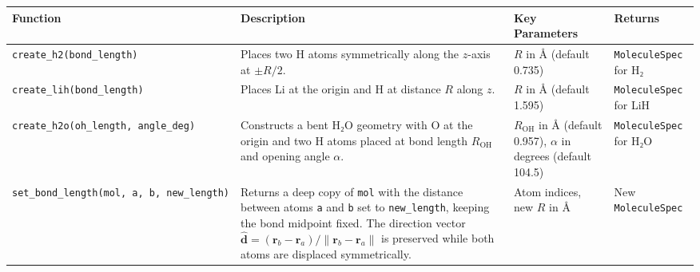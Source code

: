 \documentclass[
  11pt,
]{report}
\newcounter{none} %
\begin{document}
{\def\LTcaptype{none} %
\begin{longtable}[]{@{}
  >{\raggedright\arraybackslash}p{}
  >{\raggedright\arraybackslash}p{}
  >{\raggedright\arraybackslash}p{}
  >{\raggedright\arraybackslash}p{}@{}}
\toprule\noalign{}
\begin{minipage}[b]{\linewidth}\raggedright
Function
\end{minipage} & \begin{minipage}[b]{\linewidth}\raggedright
Description
\end{minipage} & \begin{minipage}[b]{\linewidth}\raggedright
Key Parameters
\end{minipage} & \begin{minipage}[b]{\linewidth}\raggedright
Returns
\end{minipage} \\
\midrule\noalign{}
\endhead
\bottomrule\noalign{}
\endlastfoot
\texttt{create\_h2(bond\_length)} & Places two H atoms symmetrically
along the \(z\)-axis at \(\pm R/2\). & \(R\) in Å (default 0.735) &
\texttt{MoleculeSpec} for H₂ \\
\texttt{create\_lih(bond\_length)} & Places Li at the origin and H at
distance \(R\) along \(z\). & \(R\) in Å (default 1.595) &
\texttt{MoleculeSpec} for LiH \\
\texttt{create\_h2o(oh\_length,\ angle\_deg)} & Constructs a bent H₂O
geometry with O at the origin and two H atoms placed at bond length
\(R_{\text{OH}}\) and opening angle \(\alpha\). & \(R_{\text{OH}}\) in Å
(default 0.957), \(\alpha\) in degrees (default 104.5) &
\texttt{MoleculeSpec} for H₂O \\
\texttt{set\_bond\_length(mol,\ a,\ b,\ new\_length)} & Returns a deep
copy of \texttt{mol} with the distance between atoms \texttt{a} and
\texttt{b} set to \texttt{new\_length}, keeping the bond midpoint fixed.
The direction vector
\(\hat{\mathbf{d}} = (\mathbf{r}_b - \mathbf{r}_a)/\|\mathbf{r}_b - \mathbf{r}_a\|\)
is preserved while both atoms are displaced symmetrically. & Atom
indices, new \(R\) in Å & New \texttt{MoleculeSpec} \\
\end{longtable}
}
\end{document}
